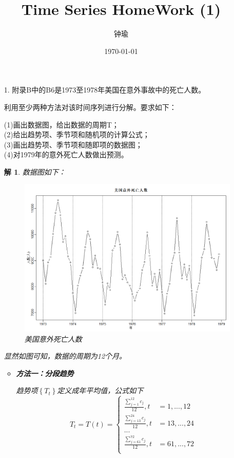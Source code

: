 \documentclass[11pt,a4paper]{ctexart}
\title{Time Series HomeWork (1)}
\author{钟瑜 \quad 222018314210044}
\date{\today}
\newtheorem*{solution}{解}
\begin{document}
\maketitle

\begin{enumerate}
	
\item[1.]附录B中的B6是1973至1978年美国在意外事故中的死亡人数。

利用至少两种方法对该时间序列进行分解。要求如下：

(1)画出数据图，给出数据的周期T；\\
(2)给出趋势项、季节项和随机项的计算公式；\\
(3)画出趋势项、季节项和随即项的数据图；\\
(4)对1979年的意外死亡人数做出预测。
\begin{solution}
	
\vspace{3ex}

数据图如下：
\begin{figure}[H]
	\centering
	\includegraphics[width=12cm]{1.png}  
	\caption{美国意外死亡人数}
\end{figure}
显然如图可知，数据的周期为12个月。

\begin{itemize}
	\item \textbf{方法一：分段趋势}
	
趋势项$\left\lbrace T_t\right\rbrace $定义成年平均值，公式如下
\begin{equation}
T_t=T(t) =\left\{
\begin{aligned}
\frac{\sum_{j=1}^{12}c_j}{12} , t &=1,...,12 \\
\frac{\sum_{j=13}^{24}c_j}{12}, t &=13,...,24 \\
...\\
\frac{\sum_{j=61}^{72}c_j}{12}, t &=61,...,72 \\
\end{aligned}
\right.
\end{equation}


\end{itemize}
\end{solution}
\end{enumerate}
\end{document}
